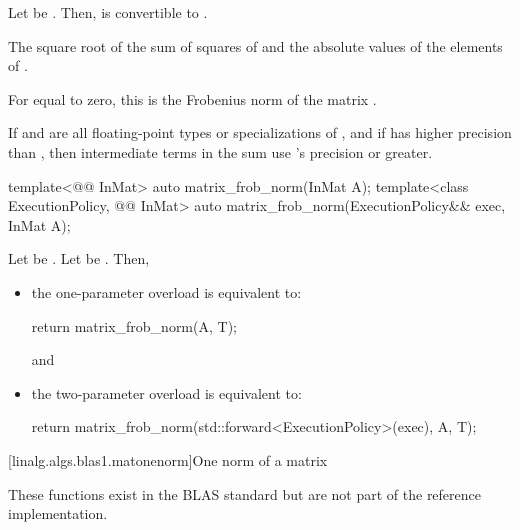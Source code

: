 \begin{itemdescr}

\pnum
\mandates
Let  be
.
Then, 
is convertible to .

\pnum
\returns
The square root of the sum of squares
of  and the absolute values of the elements of .
\begin{note}
For  equal to zero,
this is the Frobenius norm of the matrix .
\end{note}

\pnum
\remarks
If  and 
are all floating-point types or specializations of ,
and if  has higher precision
than ,
then intermediate terms in the sum use 's precision or greater.
\end{itemdescr}

\begin{itemdecl}
template<@@ InMat>
  auto matrix_frob_norm(InMat A);
template<class ExecutionPolicy, @@ InMat>
  auto matrix_frob_norm(ExecutionPolicy&& exec, InMat A);
\end{itemdecl}

\begin{itemdescr}
\pnum
\effects
Let  be
.
Let  be
.
Then,
\begin{itemize}
\item
the one-parameter overload is equivalent to:
\begin{codeblock}
return matrix_frob_norm(A, T{});
\end{codeblock}
and
\item
the two-parameter overload is equivalent to:
\begin{codeblock}
return matrix_frob_norm(std::forward<ExecutionPolicy>(exec), A, T{});
\end{codeblock}
\end{itemize}
\end{itemdescr}

[linalg.algs.blas1.matonenorm]{One norm of a matrix}

\pnum
\begin{note}
These functions exist in the BLAS standard but are not part of the reference implementation.
\end{note}

